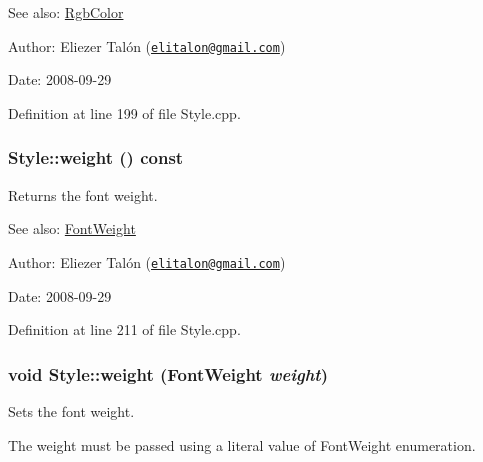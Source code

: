 \begin{Desc}
\item[See also:]\hyperlink{struct_rgb_color}{RgbColor}\end{Desc}
\begin{Desc}
\item[Author:]Eliezer Talón (\href{mailto:elitalon@gmail.com}{\tt elitalon@gmail.com}) \end{Desc}
\begin{Desc}
\item[Date:]2008-09-29 \end{Desc}


Definition at line 199 of file Style.cpp.\hypertarget{class_style_9c2124b07762f0b72dea763ef01601ed}{
\subsubsection[weight]{ Style::weight () const}}
\label{class_style_9c2124b07762f0b72dea763ef01601ed}


Returns the font weight. 

\begin{Desc}
\item[See also:]\hyperlink{_font_weight_8h_ecff23ba4a68486421bcea57e095fe66}{FontWeight}\end{Desc}
\begin{Desc}
\item[Author:]Eliezer Talón (\href{mailto:elitalon@gmail.com}{\tt elitalon@gmail.com}) \end{Desc}
\begin{Desc}
\item[Date:]2008-09-29 \end{Desc}


Definition at line 211 of file Style.cpp.\hypertarget{class_style_f1273b59bdfe98b24410177f1eea7732}{
\subsubsection[weight]{\setlength{\rightskip}{0pt plus 5cm}void Style::weight ({\bf FontWeight} {\em weight})}}
\label{class_style_f1273b59bdfe98b24410177f1eea7732}


Sets the font weight. 

The weight must be passed using a literal value of FontWeight enumeration.

